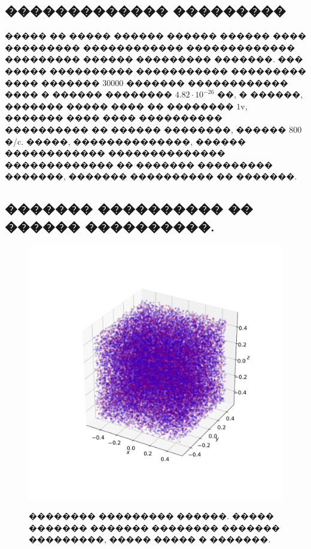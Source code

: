 \subsection{������������� ���������}

\indent ����� �� ����� ������ ������ ������ ���� ��������� ������������ ������������� ��������� ������ ��������� �������. ��� ����� ���������� ����������� ��������� ���� ������� 30000 ������� ������������ ���� � ������ �������� $4.82 \cdot 10^{-26}$ ��, � ������, ������� ����� ���� �� �������� $1$v, ������� ���� ���� ���������� ���������� �� ������ ��������, ������ $800$ �/c. �����, ��������������, ������ ������������ �������������� ������������� �� ������� ��������� �������, ������� ���������� �� �������.\\

\subsection{������� ���������� �� ������ ����������.}
\begin{figure}[!h]
{\includegraphics[width=1\linewidth]{particles}}
    \caption{�������� ��������� ������. ����� ������� ������� �������� ������� ���������, ����� ����� � �������.}
\end{figure}
